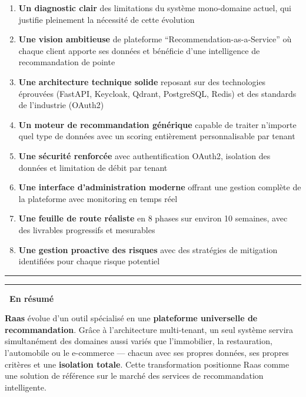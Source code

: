 \documentclass[11pt,a4paper]{report}
\newcommand{\concept}[1]{\textcolor{raasPrimary}{\textbf{#1}}}
\newcommand{\elegantsep}{\begin{center}\vspace{10pt}\textcolor{raasGray300}{\rule{0.2\textwidth}{0.5pt}\hspace{10pt}\textcolor{raasAccent}{\faDiamond}\hspace{10pt}\rule{0.2\textwidth}{0.5pt}}\vspace{10pt}\end{center}}
\begin{document}
\begin{enumerate}
    \item \textbf{Un diagnostic clair} des limitations du système mono-domaine actuel, qui justifie pleinement la nécessité de cette évolution

    \item \textbf{Une vision ambitieuse} de plateforme ``Recommendation-as-a-Service'' où chaque client apporte ses données et bénéficie d'une intelligence de recommandation de pointe

    \item \textbf{Une architecture technique solide} reposant sur des technologies éprouvées (FastAPI, Keycloak, Qdrant, PostgreSQL, Redis) et des standards de l'industrie (OAuth2)

    \item \textbf{Un moteur de recommandation générique} capable de traiter n'importe quel type de données avec un scoring entièrement personnalisable par tenant

    \item \textbf{Une sécurité renforcée} avec authentification OAuth2, isolation des données et limitation de débit par tenant

    \item \textbf{Une interface d'administration moderne} offrant une gestion complète de la plateforme avec monitoring en temps réel

    \item \textbf{Une feuille de route réaliste} en 8 phases sur environ 10 semaines, avec des livrables progressifs et mesurables

    \item \textbf{Une gestion proactive des risques} avec des stratégies de mitigation identifiées pour chaque risque potentiel
\end{enumerate}

\elegantsep

\begin{successbox}
\textbf{\faQuoteLeft\ En résumé}

\concept{Raas} évolue d'un outil spécialisé en une \textbf{plateforme universelle de recommandation}. Grâce à l'architecture multi-tenant, un seul système servira simultanément des domaines aussi variés que l'immobilier, la restauration, l'automobile ou le e-commerce --- chacun avec ses propres données, ses propres critères et une \concept{isolation totale}. Cette transformation positionne Raas comme une solution de référence sur le marché des services de recommandation intelligente.
\end{successbox}
\end{document}
